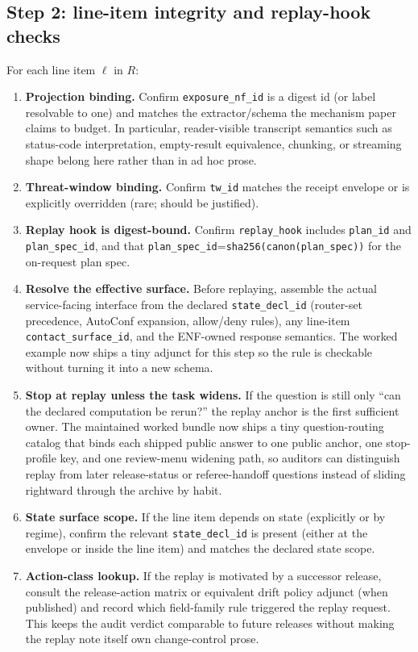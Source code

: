 \documentclass[11pt]{article}
\begin{document}
\subsection{Step 2: line-item integrity and replay-hook checks}
For each line item $\ell$ in $R$:
\begin{enumerate}[leftmargin=*]
\item \textbf{Projection binding.} Confirm \texttt{exposure\_nf\_id} is a digest id (or label resolvable to one) and matches the extractor/schema the mechanism paper claims to budget. In particular, reader-visible transcript semantics such as status-code interpretation, empty-result equivalence, chunking, or streaming shape belong here rather than in ad hoc prose.\cite{series:receiptitems,series:deployedsurfaces}
\item \textbf{Threat-window binding.} Confirm \texttt{tw\_id} matches the receipt envelope or is explicitly overridden (rare; should be justified).\cite{series:receiptitems}
\item \textbf{Replay hook is digest-bound.} Confirm \texttt{replay\_hook} includes \texttt{plan\_id} and \texttt{plan\_spec\_id}, and that \texttt{plan\_spec\_id}=\texttt{sha256(canon(plan\_spec))} for the on-request plan spec.\cite{series:planstateequiv}
\item \textbf{Resolve the effective surface.} Before replaying, assemble the actual service-facing interface from the declared \texttt{state\_decl\_id} (router-set precedence, AutoConf expansion, allow/deny rules), any line-item \texttt{contact\_surface\_id}, and the ENF-owned response semantics. The worked example now ships a tiny adjunct for this step so the rule is checkable without turning it into a new schema.\cite{series:deployedsurfaces,series:workedexample}
\item \textbf{Stop at replay unless the task widens.} If the question is still only ``can the declared computation be rerun?'' the replay anchor is the first sufficient owner. The maintained worked bundle now ships a tiny question-routing catalog that binds each shipped public answer to one public anchor, one stop-profile key, and one review-menu widening path, so auditors can distinguish replay from later release-status or referee-handoff questions instead of sliding rightward through the archive by habit.\cite{series:workedexample}
\item \textbf{State surface scope.} If the line item depends on state (explicitly or by regime), confirm the relevant \texttt{state\_decl\_id} is present (either at the envelope or inside the line item) and matches the declared state scope.\cite{series:accountingrulebook}
\item \textbf{Action-class lookup.} If the replay is motivated by a successor release, consult the release-action matrix or equivalent drift policy adjunct (when published) and record which field-family rule triggered the replay request. This keeps the audit verdict comparable to future releases without making the replay note itself own change-control prose.\cite{series:planstateequiv,series:workedexample}
\end{enumerate}
\end{document}
